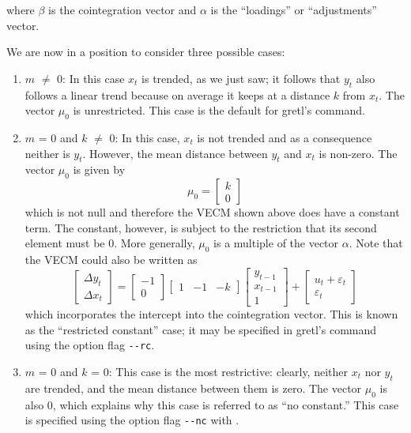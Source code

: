 %	
where $\beta$ is the cointegration vector and $\alpha$ is the
``loadings'' or ``adjustments'' vector.
     
We are now in a position to consider three possible cases:
    
\begin{enumerate}
\item $m$ $\ne$ 0: In this case $x_t$ is trended, as we just saw; it
  follows that $y_t$ also follows a linear trend because on average it
  keeps at a distance $k$ from $x_t$. The vector
  $\mu_0$ is unrestricted.  This case is the default
  for gretl's  command.
	
\item $m$ = 0 and $k$ $\ne$ 0: In this case, $x_t$ is not trended and
  as a consequence neither is $y_t$. However, the mean distance
  between $y_t$ and $x_t$ is non-zero. The vector
  $\mu_0$ is given by
%	  
  \[
  \mu_0 = \left[ \begin{array}{c} k \\ 0 \end{array} \right]
  \]
%	    
  which is not null and therefore the VECM shown above does have a
  constant term. The constant, however, is subject to the restriction
  that its second element must be 0. More generally,
  $\mu_0$ is a multiple of the vector $\alpha$. Note
  that the VECM could also be written as
%	  
  \[
  \left[ \begin{array}{c} \Delta y_t \\ \Delta x_t \end{array} \right]
  = \left[ \begin{array}{r} -1 \\ 0 \end{array} \right] \left[
    \begin{array}{rrr} 1 & -1 & -k \end{array} \right] \left[
    \begin{array}{c} y_{t-1} \\ x_{t-1} \\ 1 \end{array} \right] +
  \left[ \begin{array}{c} u_t + \varepsilon_t \\ \varepsilon_t
    \end{array} \right]
  \]
%	   
  which incorporates the intercept into the cointegration vector. This
  is known as the ``restricted constant'' case; it may be specified in
  gretl's  command using the option flag \verb+--rc+.
	
\item $m$ = 0 and $k$ = 0: This case is the most restrictive: clearly,
  neither $x_t$ nor $y_t$ are trended, and the mean distance between
  them is zero. The vector $\mu_0$ is also 0, which
  explains why this case is referred to as ``no constant.''  This case
  is specified using the option flag \verb+--nc+ with .
	
\end{enumerate}

